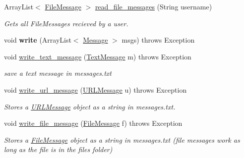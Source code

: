 \begin{DoxyCompactItemize}
\mbox{\label{class_read_write_message_ae9e2f4265707803c35efce4defefbb07}} 
Array\+List$<$ \hyperlink{class_file_message}{File\+Message} $>$ \hyperlink{class_read_write_message_ae9e2f4265707803c35efce4defefbb07}{read\+\_\+file\+\_\+messages} (String username)
\begin{DoxyCompactList}\small\item\em Gets all File\+Messages recieved by a user. \end{DoxyCompactList}\item 
\mbox{\label{class_read_write_message_ad9460192c9102b15579d7920ae5607bd}} 
void {\bfseries write} (Array\+List$<$ \hyperlink{class_message}{Message} $>$ msgs)  throws Exception     
\item 
\mbox{\label{class_read_write_message_a754e9e7cd1cc2bc011147798fbf79d89}} 
void \hyperlink{class_read_write_message_a754e9e7cd1cc2bc011147798fbf79d89}{write\+\_\+text\+\_\+message} (\hyperlink{class_text_message}{Text\+Message} m)  throws Exception     
\begin{DoxyCompactList}\small\item\em save a text message in messages.\+txt \end{DoxyCompactList}\item 
\mbox{\label{class_read_write_message_ac705a1a4c26df2286f312d44363d2cc6}} 
void \hyperlink{class_read_write_message_ac705a1a4c26df2286f312d44363d2cc6}{write\+\_\+url\+\_\+message} (\hyperlink{class_u_r_l_message}{U\+R\+L\+Message} u)  throws Exception     
\begin{DoxyCompactList}\small\item\em Stores a \hyperlink{class_u_r_l_message}{U\+R\+L\+Message} object as a string in \textquotesingle{}messages.\+txt\textquotesingle{}. \end{DoxyCompactList}\item 
void \hyperlink{class_read_write_message_abea280f7f2a29c1edac9a4b9998972ed}{write\+\_\+file\+\_\+message} (\hyperlink{class_file_message}{File\+Message} f)  throws Exception     
\begin{DoxyCompactList}\small\item\em Stores a \hyperlink{class_file_message}{File\+Message} object as a string in \textquotesingle{}messages.\+txt\textquotesingle{} (file messages work as long as the file is in the files folder) \end{DoxyCompactList}\item 

\end{DoxyCompactItemize}

